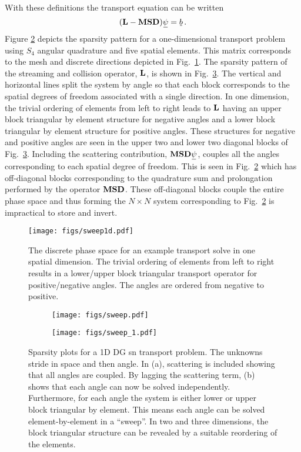 \documentclass[../doc.tex]{subfiles}
\begin{document}
With these definitions the transport equation can be written 
	\begin{equation}
		(\mat{L} - \mat{M}\mat{S}\mat{D})\ubar{\psi} = \ubar{b} \,. 
	\end{equation}
Figure \ref{sn:discrete_full} depicts the sparsity pattern for a one-dimensional transport problem using $S_4$ angular quadrature and five spatial elements. This matrix corresponds to the mesh and discrete directions depicted in Fig.~\ref{sn:sweep1d}. The sparsity pattern of the streaming and collision operator, $\boldsymbol{\mathrm{L}}$, is shown in Fig.~\ref{sn:discrete_lag}. The vertical and horizontal lines split the system by angle so that each block corresponds to the spatial degrees of freedom associated with a single direction. 
In one dimension, the trivial ordering of elements from left to right leads to $\boldsymbol{\mathrm{L}}$ having an upper block triangular by element structure for negative angles and a lower block triangular by element structure for positive angles. These structures for negative and positive angles are seen in the upper two and lower two diagonal blocks of Fig.~\ref{sn:discrete_lag}. Including the scattering contribution, $\mat{M}\mat{S}\mat{D}\ubar{\psi}$, couples all the angles corresponding to each spatial degree of freedom. This is seen in Fig.~\ref{sn:discrete_full} which has off-diagonal blocks corresponding to the quadrature sum and prolongation performed by the operator $\boldsymbol{\mathrm{M}}\boldsymbol{\mathrm{S}}\boldsymbol{\mathrm{D}}$. These off-diagonal blocks couple the entire phase space and thus forming the $N\times N$ system corresponding to Fig.~\ref{sn:discrete_full} is impractical to store and invert. 
\begin{figure}
\centering
\texttt{[image: figs/sweep1d.pdf]}
\caption{The discrete phase space for an example transport solve in one spatial dimension. The trivial ordering of elements from left to right results in a lower/upper block triangular transport operator for positive/negative angles. The angles are ordered from negative to positive. }
\label{sn:sweep1d}
\end{figure}
\begin{figure}
\centering
\begin{subfigure}{.49\textwidth}
	\centering
	\texttt{[image: figs/sweep.pdf]}
	\caption{}
	\label{sn:discrete_full}
\end{subfigure}
\begin{subfigure}{.49\textwidth}
	\centering
	\texttt{[image: figs/sweep\_1.pdf]}
	\caption{}
	\label{sn:discrete_lag}
\end{subfigure}
\caption{Sparsity plots for a 1D DG \gls{sn} transport problem. The unknowns stride in space and then angle. In (a), scattering is included showing that all angles are coupled. By lagging the scattering term, (b) shows that each angle can now be solved independently. Furthermore, for each angle the system is either lower or upper block triangular by element. This means each angle can be solved element-by-element in a ``sweep''. In two and three dimensions, the block triangular structure can be revealed by a suitable reordering of the elements.}
\label{sn:sweep}
\end{figure}
\end{document}
